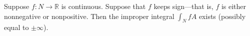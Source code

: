 Suppose $f: N \to \mathbb{R}$ is continuous. Suppose that $f$ keeps sign---that is, $f$ is either nonnegative or nonpositive. Then the improper integral $\int_N fA$ exists (possibly equal to $\pm\infty$).
